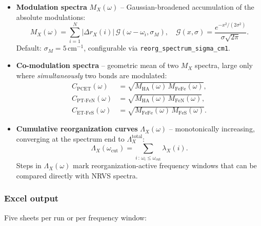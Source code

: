 \documentclass[11pt,a4paper,twoside]{article}
\theoremstyle{remark}
\begin{document}
\begin{itemize}
  \item \textbf{Modulation spectra} $M_X(\omega)$ -- Gaussian-broadened
        accumulation of the absolute modulations:
        \begin{equation}
          M_X(\omega)
          = \sum_{i=1}^{N} |\Delta r_X(i)|\,
            \mathcal{G}(\omega - \omega_i, \sigma_M),
          \quad
          \mathcal{G}(x,\sigma) = \frac{e^{-x^2/(2\sigma^2)}}{\sigma\sqrt{2\pi}}.
          \label{eq:M-spectrum}
        \end{equation}
        Default: $\sigma_M = 5$\,cm$^{-1}$, configurable via
        \texttt{reorg\_spectrum\_sigma\_cm1}.

  \item \textbf{Co-modulation spectra} -- geometric mean of two
        $M_X$ spectra, large only where \emph{simultaneously}
        two bonds are modulated:
        \begin{align}
          C_\text{PCET}(\omega) &= \sqrt{M_\text{HA}(\omega)\, M_\text{FeFe}(\omega)},\\
          C_{\text{PT-FeN}}(\omega) &= \sqrt{M_\text{HA}(\omega)\, M_\text{FeN}(\omega)},\\
          C_{\text{ET-FeS}}(\omega) &= \sqrt{M_\text{FeFe}(\omega)\, M_\text{FeS}(\omega)}.
        \end{align}

  \item \textbf{Cumulative reorganization curves} $\Lambda_X(\omega)$
        -- monotonically increasing, converging at the spectrum end
        to $\Lambda_X^\text{total}$:
        \begin{equation}
          \Lambda_X(\omega_\text{cut})
          = \sum_{i\,:\,\omega_i \le \omega_\text{cut}} \lambda_X(i).
        \end{equation}
        Steps in $\Lambda_X(\omega)$ mark reorganization-active
        frequency windows that can be compared directly with NRVS
        spectra.
\end{itemize}

\subsubsection*{Excel output}
\label{sec:reorg-excel}

Five sheets per run or per frequency window:
\end{document}
